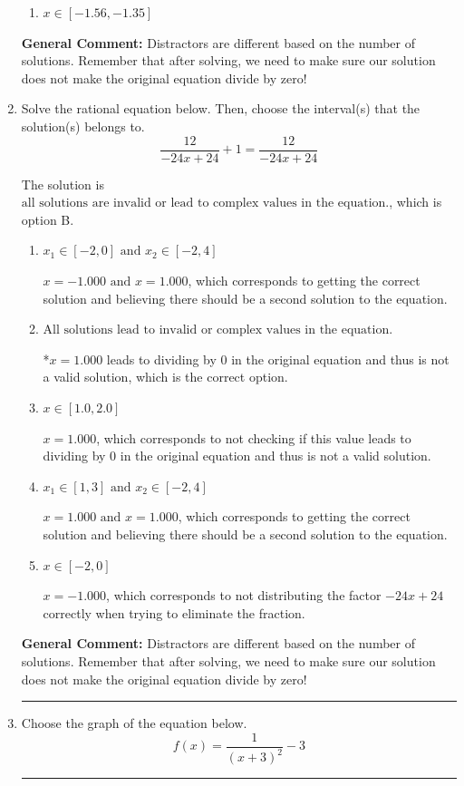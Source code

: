 \documentclass{extbook}[14pt]
\newcommand{\litem}[1]{\item #1

\rule{\textwidth}{0.4pt}}
\begin{document}
\begin{enumerate}
{\begin{enumerate}[label=\Alph*.]
\item \( x \in [-1.56,-1.35] \)


\end{enumerate}

\textbf{General Comment:} Distractors are different based on the number of solutions. Remember that after solving, we need to make sure our solution does not make the original equation divide by zero!
}
\litem{
Solve the rational equation below. Then, choose the interval(s) that the solution(s) belongs to.
\[ \frac{12}{-24x + 24} + 1 = \frac{12}{-24x + 24} \]

The solution is \( \text{all solutions are invalid or lead to complex values in the equation.} \), which is option B.\begin{enumerate}[label=\Alph*.]
\item \( x_1 \in [-2, 0] \text{ and } x_2 \in [-2,4] \)

$x = -1.000 \text{ and } x = 1.000$, which corresponds to getting the correct solution and believing there should be a second solution to the equation.
\item \( \text{All solutions lead to invalid or complex values in the equation.} \)

*$x = 1.000$ leads to dividing by 0 in the original equation and thus is not a valid solution, which is the correct option.
\item \( x \in [1.0,2.0] \)

$x = 1.000$, which corresponds to not checking if this value leads to dividing by 0 in the original equation and thus is not a valid solution.
\item \( x_1 \in [1, 3] \text{ and } x_2 \in [-2,4] \)

$x = 1.000 \text{ and } x = 1.000$, which corresponds to getting the correct solution and believing there should be a second solution to the equation.
\item \( x \in [-2,0] \)

$x = -1.000$, which corresponds to not distributing the factor $-24x + 24$ correctly when trying to eliminate the fraction.
\end{enumerate}

\textbf{General Comment:} Distractors are different based on the number of solutions. Remember that after solving, we need to make sure our solution does not make the original equation divide by zero!
}
\litem{
Choose the graph of the equation below.
\[ f(x) = \frac{1}{(x + 3)^2} - 3 \]

}
\end{enumerate}
\end{document}
